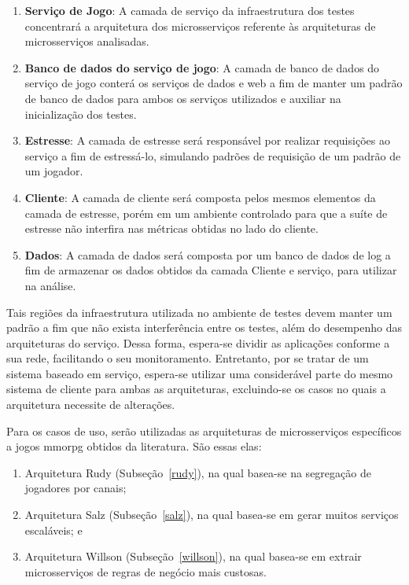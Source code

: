 \begin{enumerate}
  \item \textbf{Serviço de Jogo}: A camada de serviço da infraestrutura dos testes concentrará a arquitetura dos microsserviços referente às arquiteturas de microsserviços analisadas.
  \item \textbf{Banco de dados do serviço de jogo}: A camada de banco de dados do serviço de jogo conterá os serviços de dados e web a fim de manter um padrão de banco de dados para ambos os serviços utilizados e auxiliar na inicialização dos testes.
  \item \textbf{Estresse}: A camada de estresse será responsável por realizar requisições ao serviço a fim de estressá-lo, simulando padrões de requisição de um padrão de um jogador.
  \item \textbf{Cliente}: A camada de cliente será composta pelos mesmos elementos da camada de estresse, porém em um ambiente controlado para que a suíte de estresse não interfira nas métricas obtidas no lado do cliente.
  \item \textbf{Dados}: A camada de dados será composta por um banco de dados de log a fim de armazenar os dados obtidos da camada Cliente e serviço, para utilizar na análise.
\end{enumerate}



Tais regiões da infraestrutura utilizada no ambiente de testes devem manter um padrão a fim que não exista interferência entre os testes, além do desempenho das arquiteturas do serviço.
%
Dessa forma, espera-se dividir as aplicações conforme a sua rede, facilitando o seu monitoramento.
%
Entretanto, por se tratar de um sistema baseado em serviço, espera-se utilizar uma considerável parte do mesmo sistema de cliente para ambas as arquiteturas, excluindo-se os casos no quais a arquitetura necessite de alterações.




Para os casos de uso, serão utilizadas as arquiteturas de microsserviços específicos a jogos \ac{mmorpg} obtidos da literatura.
%
São essas elas:



\begin{enumerate}
  \item Arquitetura Rudy (Subseção~\ref{rudy}), na qual basea-se na segregação de jogadores por canais;
  \item Arquitetura Salz (Subseção~\ref{salz}), na qual basea-se em gerar muitos serviços escaláveis; e
  \item Arquitetura Willson (Subseção~\ref{willson}), na qual basea-se em extrair microsserviços de regras de negócio mais custosas.
\end{enumerate}



